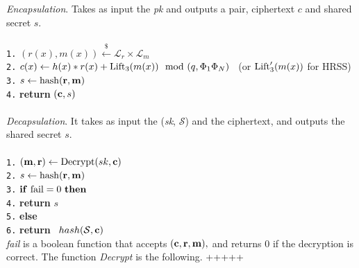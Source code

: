 \documentclass{amsart}
\numberwithin{equation}{section}
\begin{document}
 {\it Encapsulation}. Takes as input the {\it{pk}} and outputs a pair, ciphertext $c$ and shared secret $s.$\\\\
\texttt{1.} $(r(x),m(x)) \xleftarrow{\$} {\mathcal{L}}_r\times {\mathcal{L}}_m$ \\
\texttt{2.} $ c(x) \leftarrow h(x)*r(x) + {\rm{Lift}_3}(m(x)) \mod{(q,\Phi_1\Phi_N)}$ \ (or ${\rm{Lift}'_3}(m(x))$ for HRSS)\\
\texttt{3.}  $s \leftarrow {\rm{hash}}({\bf r},{\bf m})$\\
\texttt{4.} {\bf return} $({\bf c},s)$\\\\
 {\it Decapsulation}. It takes as input the ({\it{sk}}, ${\mathcal{S}}$) and the ciphertext, and outputs the shared secret $s.$\\\\
 \texttt{1.}  $({\bf m},{\bf r}) \leftarrow {\rm{Decrypt}}(sk,{\bf c})$\\
 \texttt{2.}  $ s \leftarrow {\rm hash}({\bf r},{\bf m})$\\
\texttt{3.} ${\bf if} {\ \rm fail}=0\ {\bf then}$ \\
\texttt{4.} \hspace{10pt} {\bf return}  $s$ \\
\texttt{5.}  {\bf else}\ \\
\texttt{6.}  \hspace{10pt} {\bf return}  \ $hash({\mathcal{S}},{\bf c})$ \\
  
 {\it{fail}} is a boolean function that accepts $({\bf c},{\bf r},{\bf m}),$ and returns $0$ if the decryption is correct.
 The function {\it{Decrypt}} is the following.
 +++++
\end{document}
